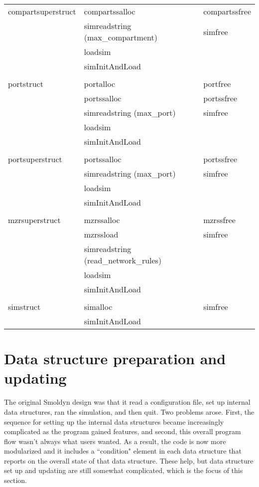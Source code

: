 \documentclass {scrbook}
\begin{document}
\begin{ttfamily}
\begin{longtable}[c]{lll}
compartsuperstruct&compartssalloc&compartssfree\\
&simreadstring (max\_compartment)&simfree\\
&loadsim\\
&simInitAndLoad\\
\\
portstruct&portalloc&portfree\\
&portssalloc&portssfree\\
&simreadstring (max\_port)&simfree\\
&loadsim\\
&simInitAndLoad\\
\\
portsuperstruct&portssalloc&portssfree\\
&simreadstring (max\_port)&simfree\\
&loadsim\\
&simInitAndLoad\\
\\
mzrsuperstruct&mzrssalloc&mzrssfree\\
&mzrssload&simfree\\
&simreadstring (read\_network\_rules)\\
&loadsim\\
&simInitAndLoad\\
\\
simstruct&simalloc&simfree\\
&simInitAndLoad\\
\end{longtable}
\end{ttfamily}

\section{Data structure preparation and updating}

The original Smoldyn design was that it read a configuration file, set up internal data structures, ran the simulation, and then quit. Two problems arose. First, the sequence for setting up the internal data structures became increasingly complicated as the program gained features, and second, this overall program flow wasn't always what users wanted. As a result, the code is now more modularized and it includes a ``condition" element in each data structure that reports on the overall state of that data structure. These help, but data structure set up and updating are still somewhat complicated, which is the focus of this section.
\end{document}
